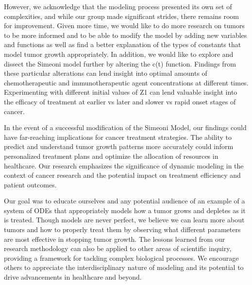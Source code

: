 \documentclass[11pt,reqno]{amsart}
\begin{document}
However, we acknowledge that the modeling process presented its own set of complexities, and while our group made significant strides, there remains room for improvement. Given more time, we would like to do more research on tumors to be more informed and to be able to modify the model by adding new variables and functions as well as find a better explanation of the types of constants that model tumor growth appropriately. In addition, we would like to explore and dissect the Simeoni model further by altering the c(t) function. Findings from these particular alterations can lend insight into optimal amounts of chemotherapeutic and immunotherapeutic agent concentrations at different times. Experimenting with different initial values of Z1 can lend valuable insight into the efficacy of treatment at earlier vs later and slower vs rapid onset stages of cancer.

In the event of a successful modification of the Simeoni Model, our findings could have far-reaching implications for cancer treatment strategies. The ability to predict and understand tumor growth patterns more accurately could inform personalized treatment plans and optimize the allocation of resources in healthcare. Our research emphasizes the significance of dynamic modeling in the context of cancer research and the potential impact on treatment efficiency and patient outcomes. 

Our goal was to educate ourselves and any potential audience of an example of a system of ODEs that appropriately models how a tumor grows and depletes as it is treated. Though models are never perfect, we believe we can learn more about tumors and how to properly treat them by observing what different parameters are most effective in stopping tumor growth. The lessons learned from our research methodology can also be applied to other areas of scientific inquiry, providing a framework for tackling complex biological processes. We encourage others to appreciate the interdisciplinary nature of modeling and its potential to drive advancements in healthcare and beyond.


\end{document}
